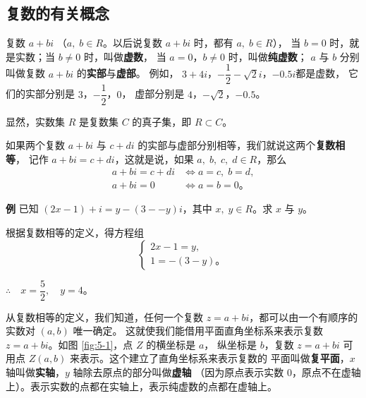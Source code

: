 \subsection{复数的有关概念}\label{subsec:5-2}

复数 $a + bi$ （$a,\; b \in R$。以后说复数 $a + bi$ 时，都有 $a,\; b \in R$），
当 $b = 0$ 时，就是实数；当 $b \neq 0$ 时，叫做\textbf{虚数}，
当 $a = 0$，$b \neq 0$ 时，叫做\textbf{纯虚数}；
$a$ 与 $b$ 分别叫做复数 $a + bi$ 的\textbf{实部}与\textbf{虚部}。
例如， $3 + 4i$，$-\dfrac{1}{2} - \sqrt{2}i$，$-0.5i$都是虚数，
它们的实部分别是 $3$，$-\dfrac{1}{2}$，$0$，
虚部分别是 $4$，$-\sqrt{2}$，$-0.5$。

显然，实数集 $R$ 是复数集 $C$ 的真子集，即 $R \subset C$。

如果两个复数 $a + bi$ 与 $c + di$ 的实部与虚部分别相等，我们就说这两个\textbf{复数相等}，
记作 $a + bi = c + di$，这就是说，如果 $a,\; b,\; c,\; d \in R$，那么
\begin{align*}
    a + bi = c + di &\iff a = c,\; b = d, \\[-1em]
    a + bi = 0 &\iff a = b = 0 \text{。}
\end{align*}

\textbf{例} \quad 已知 $(2x - 1) + i = y - (3 -- y)i$，其中 $x,\; y \in R$。求 $x$ 与 $y$。

\jie 根据复数相等的定义，得方程组
$$\begin{cases}
    2x - 1 = y, \\
    1 = -(3 - y) \text{。}
\end{cases}$$

$\therefore \quad x = \dfrac{5}{2},\quad y = 4$。


从复数相等的定义，我们知道，任何一个复数 $z = a + bi$，都可以由一个有顺序的实数对 $(a, b)$ 唯一确定。
这就使我们能借用平面直角坐标系来表示复数 $z = a + bi$。如图 \ref{fig:5-1}，点 $Z$ 的横坐标是 $a$，
纵坐标是 $b$，复数 $z = a + bi$ 可用点 $Z(a, b)$ 来表示。这个建立了直角坐标系来表示复数的
平面叫做\textbf{复平面}，$x$ 轴叫做\textbf{实轴}，$y$ 轴除去原点的部分叫做\textbf{虚轴}
（因为原点表示实数 $0$，原点不在虚轴上）。表示实数的点都在实轴上，表示纯虚数的点都在虚轴上。

\begin{figure}[H]
    \centering
    \begin{minipage}{8cm}
        \centering
        
        \caption{}\label{fig:5-1}
    \end{minipage}
    \quad
    \begin{minipage}{8cm}
        \centering
        
        \caption{}\label{fig:5-2}
    \end{minipage}
\end{figure}

